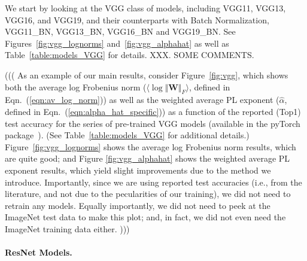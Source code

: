 We start by looking at the VGG class of models, including VGG11, VGG13, VGG16, and VGG19, and their counterparts with Batch Normalization, VGG11\_BN, VGG13\_BN, VGG16\_BN and VGG19\_BN.  
See Figures~\ref{fig:vgg_lognorms} and~\ref{fig:vgg_alphahat} as well as Table~\ref{table:models_VGG} for details.
XXX.  SOME COMMENTS.

(((
As an example of our main results, consider Figure~\ref{fig:vgg}, which shows both the average log Frobenius norm 
($\langle\log\Vert\mathbf{W}\Vert_{F}\rangle$, defined in Eqn.~(\ref{eqn:av_log_norm}))
as well as the weighted average PL exponent ($\hat{\alpha}$, defined in Eqn.~(\ref{eqn:alpha_hat_specific}))
as a function of the reported (Top1) test accuracy for the series of pre-trained VGG models (available in the pyTorch package~\cite{pyTorch}).
(See Table~\ref{table:models_VGG} for additional details.)
Figure~\ref{fig:vgg_lognorms} shows the average log Frobenius norm results, which are quite good; and 
Figure \ref{fig:vgg_alphahat} shows the weighted average PL exponent results, which yield slight improvements due to the method we introduce.
Importantly, since we are using reported test accuracies (i.e., from the literature, and not due to the pecularities of our training), we did not need to retrain any models.
Equally importantly, we did not need to peek at the ImageNet test data to make this plot; and, in fact, we did not even need the ImageNet training data either.  
)))


\paragraph{ResNet Models.}

